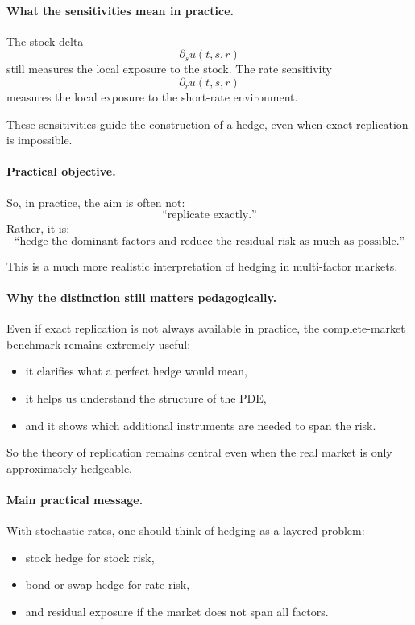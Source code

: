\documentclass[11pt]{article}
\theoremstyle{plain}
\theoremstyle{definition}
\theoremstyle{remark}
\begin{document}
\paragraph{What the sensitivities mean in practice.}
The stock delta
\[
\partial_s u(t,s,r)
\]
still measures the local exposure to the stock.
The rate sensitivity
\[
\partial_r u(t,s,r)
\]
measures the local exposure to the short-rate environment.

These sensitivities guide the construction of a hedge, even when exact
replication is impossible.

\paragraph{Practical objective.}
So, in practice, the aim is often not:
\[
\text{``replicate exactly.''}
\]
Rather, it is:
\[
\text{``hedge the dominant factors and reduce the residual risk as much
as possible.''}
\]

This is a much more realistic interpretation of hedging in multi-factor
markets.

\paragraph{Why the distinction still matters pedagogically.}
Even if exact replication is not always available in practice, the
complete-market benchmark remains extremely useful:
\begin{itemize}[leftmargin=1.4em]
    \item it clarifies what a perfect hedge would mean,
    \item it helps us understand the structure of the PDE,
    \item and it shows which additional instruments are needed to span
    the risk.
\end{itemize}

So the theory of replication remains central even when the real market
is only approximately hedgeable.

\paragraph{Main practical message.}
With stochastic rates, one should think of hedging as a layered problem:
\begin{itemize}[leftmargin=1.4em]
    \item stock hedge for stock risk,
    \item bond or swap hedge for rate risk,
    \item and residual exposure if the market does not span all factors.
\end{itemize}
\end{document}
